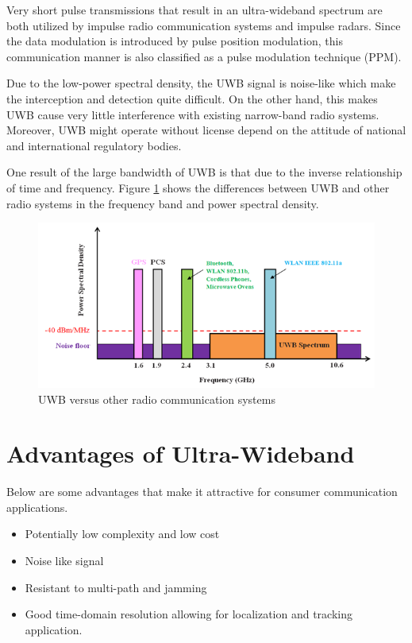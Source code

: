 \documentclass[\main/main.tex]{subfiles}
\begin{document}
Very short pulse transmissions that result in an ultra-wideband spectrum are both utilized by impulse radio communication systems and impulse radars. Since the data modulation is introduced by pulse position modulation,  this communication manner is also classified as a pulse modulation technique (PPM).

Due to the low-power spectral density, the UWB signal is noise-like which make the interception and detection quite difficult. On the other hand, this makes UWB cause very little interference with existing narrow-band radio systems. Moreover, UWB might operate without license depend on the attitude of national and international regulatory bodies.

One result of the large bandwidth of UWB is that due to the inverse relationship of
time and frequency. Figure \ref{fig:uwb_versus_other_radio_communication_systems} shows the differences between UWB and other radio systems in the frequency band and power spectral density.

\begin{figure}[H]
    \centering
    \includegraphics[width=1\textwidth]{uwb_versus_other_radio_communication_systems.png}
    \caption{UWB versus other radio communication systems}
    \label{fig:uwb_versus_other_radio_communication_systems}
\end{figure}

\section{Advantages of Ultra-Wideband}

Below \cite{uwb_theory_and_applications} are some advantages that make it attractive for consumer communication applications.
\begin{itemize}
    \item Potentially low complexity and low cost
    \item Noise like signal
    \item Resistant to multi-path and jamming
    \item Good time-domain resolution allowing for localization and tracking application.
\end{itemize}
\end{document}
